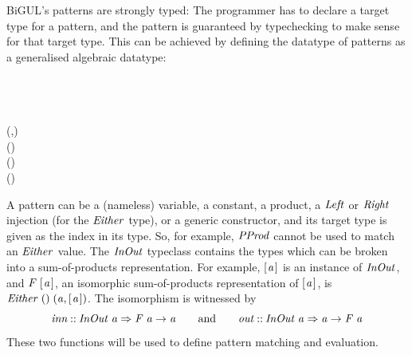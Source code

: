 BiGUL's patterns are strongly typed: The programmer has to declare a target type for a pattern, and the pattern is guaranteed by typechecking to make sense for that target type.
This can be achieved by defining the datatype of patterns as a generalised algebraic datatype:
\begin{hscode}\SaveRestoreHook
{}%
%
%
%
%
%
\>[B]{}\;\;\;\<[E]%
\\
\>[B]{}\<[3]%
\>[3]{}\<[11]%
\>[11]{}\mathbin{::}{}\<[11E]%
\>[15]{}\;\Rightarrow {}\;\<[E]%
\\
\>[B]{}\<[3]%
\>[3]{}\<[11]%
\>[11]{}\mathbin{::}{}\<[11E]%
\>[15]{}\;\Rightarrow {}\to {}\;\<[E]%
\\
\>[B]{}\<[3]%
\>[3]{}\<[11]%
\>[11]{}\mathbin{::}{}\<[11E]%
\>[15]{}\;\to {}\;\to {}\;(,){}\<[E]%
\\
\>[B]{}\<[3]%
\>[3]{}\<[11]%
\>[11]{}\mathbin{::}{}\<[11E]%
\>[15]{}\;\to {}\;(\;\;){}\<[E]%
\\
\>[B]{}\<[3]%
\>[3]{}\<[11]%
\>[11]{}\mathbin{::}{}\<[11E]%
\>[15]{}\;\to {}\;(\;\;){}\<[E]%
\\
\>[B]{}\<[3]%
\>[3]{}\<[11]%
\>[11]{}\mathbin{::}{}\<[11E]%
\>[15]{}\;\Rightarrow {}\;(\;)\to {}\;\<[E]%
\ColumnHook
\end{hscode}\resethooks
A pattern can be a (nameless) variable, a constant, a product, a \ensuremath{\Conid{Left}} or \ensuremath{\Conid{Right}} injection (for the \ensuremath{\Conid{Either}} type), or a generic constructor, and its target type is given as the index in its type.
So, for example, \ensuremath{\Conid{PProd}} cannot be used to match an \ensuremath{\Conid{Either}} value.
The \ensuremath{\Conid{InOut}} typeclass contains the types which can be broken into a sum-of-products representation.
For example, \ensuremath{[\mskip1.5mu \Varid{a}\mskip1.5mu]} is an instance of \ensuremath{\Conid{InOut}}, and \ensuremath{\Conid{F}\;[\mskip1.5mu \Varid{a}\mskip1.5mu]}, an isomorphic sum-of-products representation of \ensuremath{[\mskip1.5mu \Varid{a}\mskip1.5mu]}, is \ensuremath{\Conid{Either}\;()\;(\Varid{a},[\mskip1.5mu \Varid{a}\mskip1.5mu])}.
The isomorphism is witnessed by
\[ \mathit{inn}\mathbin{::}\mathit{InOut}\;\mathit{a}\Rightarrow \mathit{F}\;\mathit{a}\to \mathit{a} \qquad\text{and}\qquad \mathit{out}\mathbin{::}\mathit{InOut}\;\mathit{a}\Rightarrow \mathit{a}\to \mathit{F}\;\mathit{a} \]
These two functions will be used to define pattern matching and evaluation.

